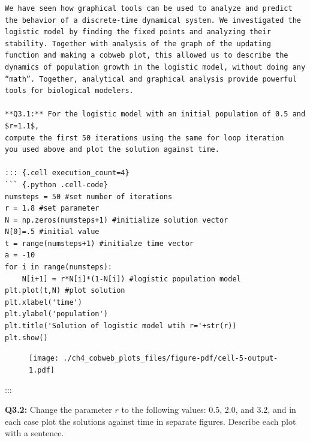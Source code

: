 \documentclass[
  letterpaper,
  DIV=11,
  numbers=noendperiod]{scrreprt}
\begin{document}
\begin{verbatim}
We have seen how graphical tools can be used to analyze and predict the behavior of a discrete-time dynamical system. We investigated the logistic model by finding the fixed points and analyzing their stability. Together with analysis of the graph of the updating function and making a cobweb plot, this allowed us to describe the dynamics of population growth in the logistic model, without doing any “math”. Together, analytical and graphical analysis provide powerful tools for biological modelers.

**Q3.1:** For the logistic model with an initial population of 0.5 and $r=1.1$, 
compute the first 50 iterations using the same for loop iteration
you used above and plot the solution against time. 

::: {.cell execution_count=4}
``` {.python .cell-code}
numsteps = 50 #set number of iterations
r = 1.8 #set parameter
N = np.zeros(numsteps+1) #initialize solution vector
N[0]=.5 #initial value
t = range(numsteps+1) #initialze time vector
a = -10
for i in range(numsteps):
    N[i+1] = r*N[i]*(1-N[i]) #logistic population model
plt.plot(t,N) #plot solution
plt.xlabel('time')
plt.ylabel('population')
plt.title('Solution of logistic model wtih r='+str(r))
plt.show()
\end{verbatim}

\begin{figure}[H]

{\centering \texttt{[image: ./ch4\_cobweb\_plots\_files/figure-pdf/cell-5-output-1.pdf]}

}

\end{figure}

:::

\textbf{Q3.2:} Change the parameter \(r\) to the following values: 0.5,
2.0, and 3.2, and in each case plot the solutions against time in
separate figures. Describe each plot with a sentence.
\end{document}
